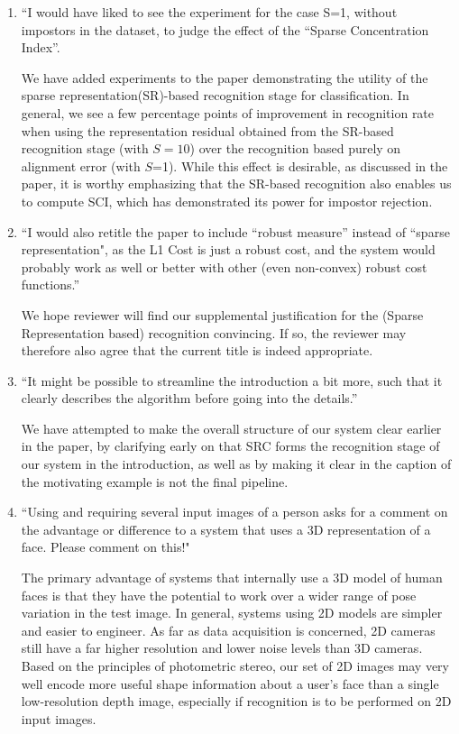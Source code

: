 \documentclass[11pt]{article}
\begin{document}
\begin{enumerate}
\item ``I would have liked to see the experiment for the case S=1, without
impostors in the dataset, to judge the effect of the ``Sparse
Concentration Index''.

We have added experiments to the paper demonstrating
the utility of the sparse representation(SR)-based
recognition stage for classification.  In general, we see a
few percentage points of improvement in recognition rate
when using the representation residual obtained from the
SR-based recognition stage (with $S=10$) over the
recognition based purely on alignment error (with $S$=1).
While this effect is desirable, as discussed in the paper,
it is worthy emphasizing that the SR-based recognition also
enables us to compute SCI, which has demonstrated its power
for impostor rejection.

\item ``I would also retitle the paper to include ``robust measure''
instead of ``sparse representation", as the L1 Cost is just a robust
cost, and the system would probably work as well or better with other
(even non-convex) robust cost functions.''

We hope reviewer will find our supplemental justification for the (Sparse
Representation based) recognition convincing.  If so, the reviewer may
therefore also agree that the current title is indeed appropriate.

\item ``It might be possible to streamline the introduction a bit more, such that it
clearly describes the algorithm before going into the details.''

We have attempted to make the overall structure of our system clear earlier in the
paper, by clarifying early on that SRC forms the recognition stage of our system
in the introduction, as well as by making it clear in the caption of the motivating example
is not the final pipeline.

\item ``Using and requiring several input images of a person asks for a
comment on the advantage or difference to a system that uses
a 3D representation of a face. Please comment on this!"

The primary advantage of systems that internally use a 3D model of human faces
is that they have the potential to work over a wider range of pose variation in
the test image.  In general, systems using 2D models are simpler and easier to
engineer.  As far as data acquisition is concerned, 2D cameras still have a far
higher resolution and lower noise levels than 3D cameras.  Based on the principles
of photometric stereo, our set of 2D images may very well encode more useful shape
information about a user's face than a single low-resolution depth image, especially if
recognition is to be performed on 2D input images.


\end{enumerate}
\end{document}
